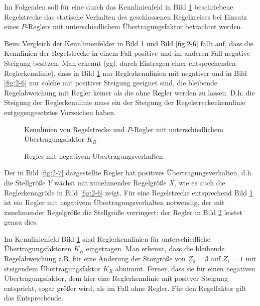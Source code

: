 Im Folgenden soll für eine durch das Kennlinienfeld in Bild \ref{fig:2-8} beschriebene Regelstrecke das statische Verhalten des geschlossenen Regelkreises bei Einsatz eines \(P\)-Reglers mit unterschiedlichem Übertragungsfaktor betrachtet werden.

Beim Vergleich der Kennlinienfelder in Bild \ref{fig:2-8} und Bild \ref{fig:2-6} fällt auf, dass die Kennlinien der Regelstrecke in einem Fall positive und im anderen Fall negative Steigung besitzen.
Man erkennt (ggf. durch Eintragen einer entsprechenden Reglerkennlinie), dass in Bild \ref{fig:2-8} nur Reglerkennlinien mit negativer und in Bild \ref{fig:2-6} nur solche mit positiver Steigung geeignet sind, die bleibende Regelabweichung mit Regler keiner als die ohne Regler werden zu lassen.
D.h. die Steigung der Reglerkennlinie muss ein der Steigung der Regelstreckenkennlinie entgegengesetztes Vorzeichen haben.

\begin{figure}[h]
    \centering
    \caption{Kennlinien von Regelstrecke und \(P\)-Regler mit unterschiedlichem Übertragungsfaktor \(K_R\)}
    \label{fig:2-8}
\end{figure}

\begin{figure}[h]
    \centering
    \caption{Regler mit negativem Übertragungsverhalten}
    \label{fig:2-9}
\end{figure}

Der in Bild \ref{fig:2-7} dargestellte Regler hat positives Übertragungsverhalten, d.h. die Stellgröße \(Y\) wächst mit zunehmender Regelgröße \(X\), wie es auch die Reglerkenngröße in Bild \ref{fig:2-6} zeigt.
Für eine Regelstrecke entsprechend Bild \ref{fig:2-8} ist ein Regler mit negativem Übertragungsverhalten notwendig, der mit zunehmender Regelgröße die Stellgröße verringert; der Regler in Bild \ref{fig:2-9} leistet genau dies.

Im Kennlinienfeld Bild \ref{fig:2-8} sind Reglerkennlinien für unterschiedliche Übertragungsfaktoren \(K_R\) eingetragen.
Man erkennt, dass die bleibende Regelabweichung z.B. für eine Änderung der Störgröße von \(Z_0 = 3\) auf \(Z_1 = 1\) mit steigendem Übertragungsfaktor \(K_R\) abnimmt.
Ferner, dass sie für einen negativen Übertragungsfaktor, dem hier eine Reglerkennlinie mit positver Steigung entspricht, sogar größer wird, als im Fall ohne Regler.
Für den Regelfaktor gilt das Entsprechende.

